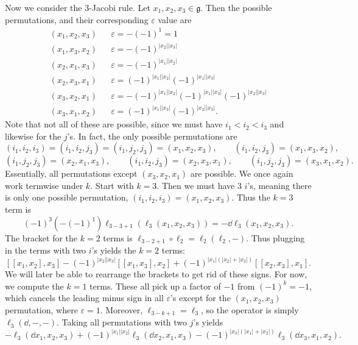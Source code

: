 Now we consider the 3-Jacobi rule. Let $x_1,x_2,x_3\in \mathfrak{g} $. Then the possible permutations, and their corresponding $\varepsilon $ value are
\begin{align*}
	(x_1,x_2,x_3)&& \varepsilon =-(-1)^{1}=1\\
	(x_1,x_3,x_2) && \varepsilon =-(-1)^{\left| x_2 \right| \left| x_3 \right| } \\
	(x_2,x_1,x_3) && \varepsilon =-(-1)^{\left| x_1 \right| \left| x_2 \right|}\\
	(x_2,x_3,x_1) && \varepsilon =(-1)^{\left| x_1 \right| \left| x_2 \right|}(-1)^{\left| x_1 \right| \left| x_3 \right| } \\
	(x_3,x_2,x_1) && \varepsilon =-(-1)^{\left| x_1 \right| \left| x_2 \right| }(-1)^{\left| x_1 \right| \left| x_3 \right| } (-1)^{\left| x_2 \right| \left| x_3 \right| } \\
	(x_3,x_1,x_2) && \varepsilon =(-1)^{\left| x_1 \right| \left| x_3 \right| } (-1)^{\left| x_2 \right| \left| x_3 \right| } 
.\end{align*}
Note that not all of these are possible, since we must have $i_1 < i_2 < i_3$ and likewise for the $j$'s. In fact, the only possible permutations are
\[
	(i_1,i_2,i_3) = (i_1,i_2,j_3) = (i_1,j_2,j_3) = (x_1,x_2,x_3),\qquad (i_1,i_2,j_3) = (x_1,x_3,x_2),
\]
\[
	(i_1,j_2,j_3) = (x_2,x_1,x_3),\qquad (i_1,i_2,j_3) = (x_2,x_3,x_1),\qquad (i_1,j_2,j_3) = (x_3,x_1,x_2)
.\]
Essentially, all permutations except $(x_3,x_2,x_1)$ are possible. We once again work termwise under $k$. Start with $k=3$. Then we must have 3 $i$'s, meaning there is only one possible permutation, $(i_1,i_2,i_3) = (x_1,x_2,x_3)$. Thus the $k=3$ term is
\[
	(-1)^3(-(-1)^1) \ell_{3-3+1} (\ell _3(x_1,x_2,x_3)) = -\dd \ell _3(x_1,x_2,x_3)
.\]
The bracket for the $k=2$ terms is $\ell _{3-2+1} \circ \ell_2 = \ell_2(\ell _2,-)$. Thus plugging in the terms with two $i$'s yields the $k=2$ terms:
\[
	[[x_1,x_2],x_3] - (-1)^{\left| x_2 \right| \left| x_3 \right| } [[x_1,x_3],x_2] + (-1)^{\left| x_1 \right| (\left| x_2 \right| +\left| x_3 \right|)} [[x_2,x_3],x_1]
.\]
We will later be able to rearrange the brackets to get rid of these signs. For now, we compute the $k=1$ terms. These all pick up a factor of $-1$ from $(-1)^k=-1$, which cancels the leading minus sign in all $\varepsilon $'s except for the $(x_1,x_2,x_3)$ permutation, where $\varepsilon =1$. Moreover, $\ell _{3-k+1} =\ell _3$, so the operator is simply $\ell _3(\dd ,-,-)$. Taking all permutations with two $j$'s yields
\[
	-\ell _3(\dd x_1,x_2,x_3) + (-1)^{\left| x_1 \right| \left| x_2 \right| } \ell _3(\dd x_2,x_1,x_3) - (-1)^{\left| x_3 \right| (\left| x_1 \right| +\left| x_2 \right| )} \ell _3(\dd x_3,x_1,x_2)
.\]
